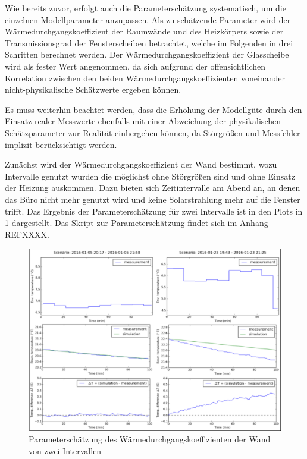 Wie bereits zuvor, erfolgt auch die Parameterschätzung systematisch, um die einzelnen Modellparameter anzupassen. Als zu schätzende Parameter wird der Wärmedurchgangskoeffizient der Raumwände und des Heizkörpers sowie der Transmissionsgrad der Fensterscheiben betrachtet, welche im Folgenden in drei Schritten berechnet werden. Der Wärmedurchgangskoeffizient der Glasscheibe wird als fester Wert angenommen, da sich aufgrund der offensichtlichen Korrelation zwischen den beiden Wärmedurchgangskoeffizienten voneinander nicht-physikalische Schätzwerte ergeben können.

Es muss weiterhin beachtet werden, dass die Erhöhung der Modellgüte durch den Einsatz realer Messwerte ebenfalls mit einer Abweichung der physikalischen Schätzparameter zur Realität einhergehen können, da Störgrößen und Messfehler implizit berücksichtigt werden.

Zunächst wird der Wärmedurchgangskoeffizient der Wand bestimmt, wozu Intervalle genutzt wurden die möglichst ohne Störgrößen sind und ohne Einsatz der Heizung auskommen. Dazu bieten sich Zeitintervalle am Abend an, an denen das Büro nicht mehr genutzt wird und keine Solarstrahlung mehr auf die Fenster trifft. Das Ergebnis der Parameterschätzung für zwei Intervalle ist in den Plots in \ref{fig:step1} dargestellt. Das Skript zur Parameterschätzung findet sich im Anhang REFXXXX.

\begin{figure}
\centering
\includegraphics[width=\textwidth]{abbildungen/20160329_pestep1}
\caption{Parameterschätzung des Wärmedurchgangskoeffizienten der Wand von zwei Intervallen}
\label{fig:step1}
\end{figure}

